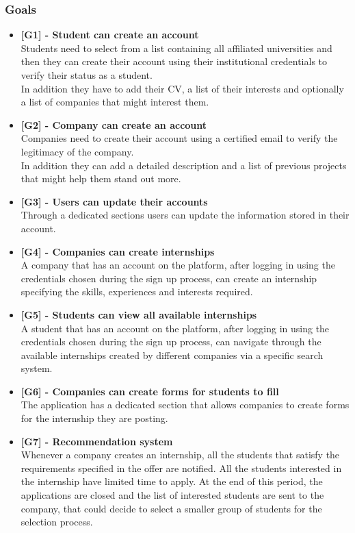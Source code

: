 \documentclass[11pt,twoside]{article}
\begin{document}
\subsubsection{Goals}
\begin{itemize}
\item \textbf{[G1] - Student can create an account} \\
Students need to select from a list containing all affiliated universities and then they can create their account using their institutional credentials to verify their status as a student. \\
In addition they have to add their CV, a list of their interests and optionally a list of companies that might interest them.
\item \textbf{[G2] - Company can create an account} \\
Companies need to create their account using a certified email to verify the legitimacy of the company. \\
In addition they can add a detailed description and a list of previous projects that might help them stand out more.
\item \textbf{[G3] - Users can update their accounts} \\
Through a dedicated sections users can update the information stored in their account.
\item \textbf{[G4] - Companies can create internships} \\
A company that has an account on the platform, after logging in using the credentials chosen during the sign up process, can create an internship specifying the skills, experiences and interests required.
\item \textbf{[G5] - Students can view all available internships} \\
A student that has an account on the platform, after logging in using the credentials chosen during the sign up process, can navigate through the available internships created by different companies via a specific search system.
\item \textbf{[G6] - Companies can create forms for students to fill} \\
The application has a dedicated section that allows companies to create forms for the internship they are posting.
\item \textbf{[G7] - Recommendation system} \\
Whenever a company creates an internship, all the students that satisfy the requirements specified in the offer are notified. All the students interested in the internship have limited time to apply. At the end of this period, the applications are closed and the list of interested students are sent to the company, that could decide to select a smaller group of students for the selection process.

\end{itemize}
\end{document}
